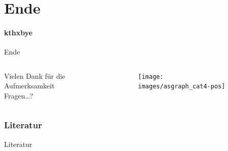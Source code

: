 \documentclass[ngerman,compress,hyperref={bookmarks}]{beamer}
\begin{document}
\part{Ende}
\subsection{kthxbye}
\begin{frame}[plain]{Ende}
\begin{columns}[t]
\begin{column}{0.5\textwidth}
 \begin{center}
 \vspace{1cm}
 Vielen Dank für die Aufmerksamkeit\\
 \vspace{1.5cm}
 Fragen\ldots?
 \end{center}
\end{column}
\begin{column}{0.5\textwidth}
 \vspace{-1cm}
 \begin{figure}
  \label{asngraphs2}
  \texttt{[image: images/asgraph\_cat4-pos]}
 \end{figure}
\end{column}
\end{columns}
\end{frame}

\section{Literatur}
\begin{frame}{Literatur}
\scriptsize

%

\end{frame}
\end{document}
